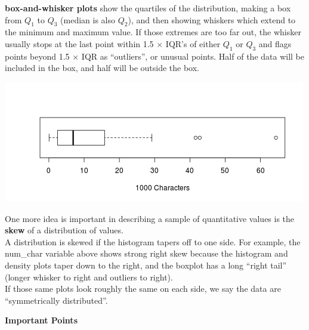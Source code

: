 \begin{list}{}{}
\begin{list}{}{}
   \item [\bf box-and-whisker plots] show the quartiles of the
     distribution, making a box from $Q_1$ to $Q_3$ (median is also $Q_2$), and
     then showing whiskers which extend to the minimum and maximum
     value. If those extremes are too far out, the whisker usually
     stops at the last point within 1.5 $\times$ IQR's of either
     $Q_1$ or $Q_3$ and flags points beyond 1.5 $\times$ IQR as
     ``outliers'', or unusual points.  
     Half of the data will be included in the box, and half will be
     outside the box. \vspace{-1cm}
  \begin{center}
  \includegraphics[width = .8\linewidth]{../plots/boxplotDemo1.png} \vspace{-.5cm}
  \end{center}

\end{list}
\end{list}



One more idea is important in describing a sample of quantitative
values is the {\bf skew} of a distribution of values.  \\
  A distribution is skewed if the histogram tapers off to one
  side. For example, the num\_char variable above shows strong right
  skew because the histogram and density plots taper down to the
  right, and the boxplot has a long ``right tail'' (longer whisker to
  right and outliers to right).
\\
 If those same plots look roughly the same on each side, we say the
 data  are ``symmetrically distributed''.


 \begin{center}
   {\large\bf Important Points}
 \end{center}


